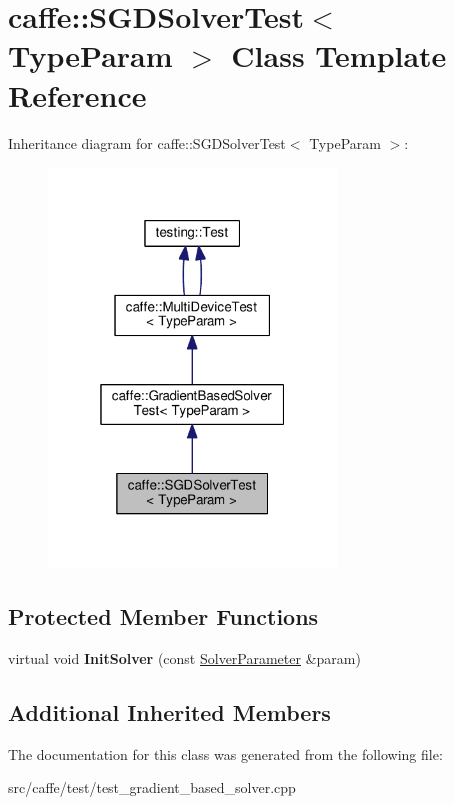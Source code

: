 \hypertarget{classcaffe_1_1_s_g_d_solver_test}{}\section{caffe\+:\+:S\+G\+D\+Solver\+Test$<$ Type\+Param $>$ Class Template Reference}
\label{classcaffe_1_1_s_g_d_solver_test}


Inheritance diagram for caffe\+:\+:S\+G\+D\+Solver\+Test$<$ Type\+Param $>$\+:
\nopagebreak
\begin{figure}[H]
\begin{center}
\leavevmode
\includegraphics[width=217pt]{classcaffe_1_1_s_g_d_solver_test__inherit__graph}
\end{center}
\end{figure}
\subsection*{Protected Member Functions}
\begin{DoxyCompactItemize}
\item 
\mbox{\label{classcaffe_1_1_s_g_d_solver_test_a9ac757bac190cb2aecb920a573e249e3}} 
virtual void {\bfseries Init\+Solver} (const \mbox{\hyperlink{classcaffe_1_1_solver_parameter}{Solver\+Parameter}} \&param)
\end{DoxyCompactItemize}
\subsection*{Additional Inherited Members}


The documentation for this class was generated from the following file\+:\begin{DoxyCompactItemize}
\item 
src/caffe/test/test\+\_\+gradient\+\_\+based\+\_\+solver.\+cpp\end{DoxyCompactItemize}
